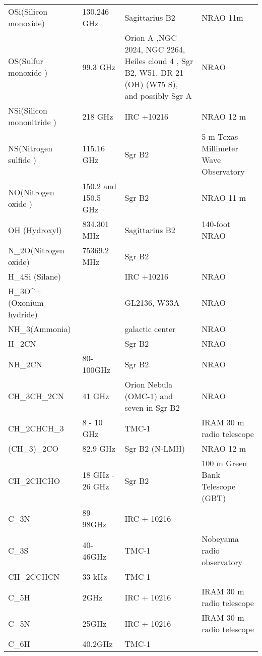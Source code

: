 \documentclass{article}
\begin{document}
\begin{tabular}{|m{3cm}|m{3cm}|m{3cm}|m{3cm}|}
\hline
OSi(Silicon monoxide)&130.246 GHz&Sagittarius B2 &NRAO 11m\\
OS(Sulfur monoxide )& 99.3 GHz &Orion A ,NGC 2024, NGC 2264, Heiles cloud 4 , Sgr B2, W51, DR 21 (OH) (W75 S), and possibly Sgr A &NRAO\\
NSi(Silicon mononitride ) &218 GHz &IRC +10216 & NRAO 12 m \\
NS(Nitrogen sulfide ) &115.16 GHz &Sgr B2 & 5 m Texas Millimeter Wave Observatory \\
NO(Nitrogen oxide ) &150.2 and 150.5 GHz&Sgr B2 &NRAO 11 m \\
OH (Hydroxyl) &834.301 MHz&Sagittarius B2 &140-foot NRAO \\
N_2O(Nitrogen oxide) &75369.2 MHz&Sgr B2 &\\
H_4Si (Silane) && IRC +10216&NRAO\\
H_3O^+(Oxonium hydride) && GL2136, W33A&NRAO\\
NH_3(Ammonia)&& galactic center&NRAO\\

H_2CN && Sgr B2 &NRAO \\
NH_2CN& 80-100GHz& Sgr B2  & NRAO  \\
CH_3CH_2CN    & 41 GHz    & Orion Nebula   (OMC-1) and seven in Sgr B2   & NRAO  \\
CH_2CHCH_3& 8 - 10 GHz  & TMC-1  & IRAM 30 m radio telescope      \\
(CH_3)_2CO   & 82.9 GHz& Sgr B2   (N-LMH) & NRAO 12 m   \\
CH_2CHCHO   & 18 GHz - 26   GHz & Sgr B2  & 100 m Green Bank Telescope (GBT)   \\
C_3N   & 89-98GHz  & IRC + 10216       & \\
C_3S& 40-46GHz  & TMC-1  & Nobeyama   radio observatory \\
CH_2CCHCN   & 33 kHz  & TMC-1&         \\
C_5H  & 2GHz   & IRC + 10216   & IRAM 30 m   radio telescope   \\
C_5N    & 25GHz    & IRC + 10216& IRAM 30 m   radio telescope   \\
C_6H    & 40.2GHz  & TMC-1    &    \\
\hline
\end{tabular}
\end{document}
